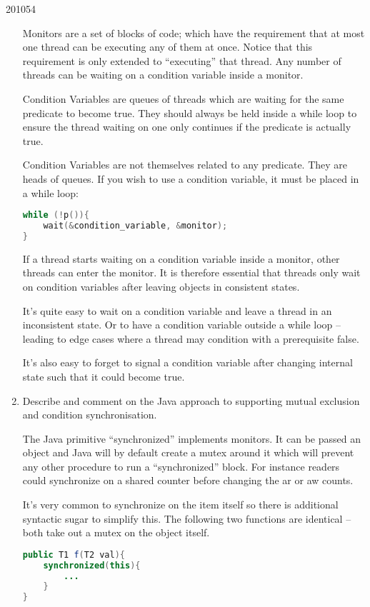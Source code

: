 \documentclass[10pt,\jkfside,a4paper]{article}
\begin{document}
\begin{examquestion}{2010}{5}{4}
\begin{enumerate}[label=(\alph*)]
Monitors are a set of blocks of code; which have the requirement that at most
one thread can be executing any of them at once. Notice that this
requirement is only extended to ``executing'' that thread. Any number of
threads can be waiting on a condition variable inside a monitor.

Condition Variables are queues of threads which are waiting for the same
predicate to become true. They should always be held inside a while loop to
ensure the thread waiting on one only continues if the predicate is actually
true.

Condition Variables are not themselves related to any predicate. They are
heads of queues. If you wish to use a condition variable, it must be placed
in a while loop:

\begin{lstlisting}[language=C]
while (!p()){
	wait(&condition_variable, &monitor);
}
\end{lstlisting}

If a thread starts waiting on a condition variable inside a monitor, other
threads can enter the monitor. It is therefore essential that threads only
wait on condition variables after leaving objects in consistent states.

It's quite easy to wait on a condition variable and leave a thread in an
inconsistent state. Or to have a condition variable outside a while loop --
leading to edge cases where a thread may condition with a prerequisite false.

It's also easy to forget to signal a condition variable after changing
internal state such that it could become true.

\fi

\item Describe and comment on the Java approach to supporting mutual
exclusion and condition synchronisation.

The Java primitive ``synchronized'' implements monitors. It can be passed an
object and Java will by default create a mutex around it which will prevent
any other procedure to run a ``synchronized'' block. For instance readers
could synchronize on a shared counter before changing the ar or aw counts.

It's very common to synchronize on the item itself so there is additional
syntactic sugar to simplify this. The following two functions are identical
-- both take out a mutex on the object itself.

\begin{lstlisting}[language=Java]
public T1 f(T2 val){
	synchronized(this){
		...
	}
}


\end{lstlisting}
\end{enumerate}
\end{examquestion}
\end{document}
